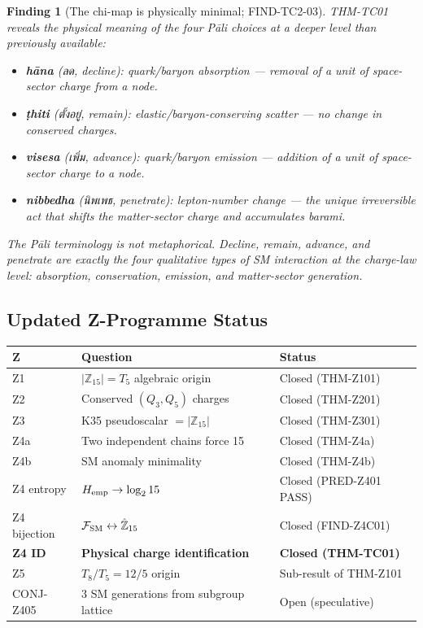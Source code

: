 \documentclass[12pt, a4paper]{article}
\newtheorem{finding}{Finding}[section]
\begin{document}
\begin{finding}[The chi-map is physically minimal; FIND-TC2-03]
THM-TC01 reveals the physical meaning of the four Pāli choices
at a deeper level than previously available:
\begin{itemize}[leftmargin=*, noitemsep]
  \item \textbf{hāna} (ลด, decline): quark/baryon absorption — removal
    of a unit of space-sector charge from a node.
  \item \textbf{ṭhiti} (ตั้งอยู่, remain): elastic/baryon-conserving
    scatter — no change in conserved charges.
  \item \textbf{visesa} (เพิ่ม, advance): quark/baryon emission —
    addition of a unit of space-sector charge to a node.
  \item \textbf{nibbedha} (นิพเพธ, penetrate): lepton-number change —
    the unique irreversible act that shifts the matter-sector
    charge and accumulates barami.
\end{itemize}
The Pāli terminology is not metaphorical. Decline, remain, advance,
and penetrate are exactly the four qualitative types of SM interaction
at the charge-law level: absorption, conservation, emission, and
matter-sector generation.
\end{finding}

\subsection{Updated Z-Programme Status}
\label{sec:status}

\begin{derivedbox}[title={Z-Programme: Final Status}]
{\small
\renewcommand{\arraystretch}{1.30}
\begin{tabular}{p{1.2cm} p{7.5cm} p{3.5cm}}
\toprule
\textbf{Z} & \textbf{Question} & \textbf{Status} \\
\midrule
Z1 & $|\mathbb{Z}_{15}| = T_5$ algebraic origin & Closed (THM-Z101) \\
Z2 & Conserved $(Q_3, Q_5)$ charges & Closed (THM-Z201) \\
Z3 & K35 pseudoscalar $= |\mathbb{Z}_{15}|$ & Closed (THM-Z301) \\
Z4a & Two independent chains force 15 & Closed (THM-Z4a) \\
Z4b & SM anomaly minimality & Closed (THM-Z4b) \\
Z4 entropy & $H_{\rm emp} \to \log_2 15$ & Closed (PRED-Z401 PASS) \\
Z4 bijection & $\mathcal{F}_{\rm SM} \leftrightarrow \hat{\mathbb{Z}}_{15}$ & Closed (FIND-Z4C01) \\
\textbf{Z4 ID} & \textbf{Physical charge identification} &
  \textbf{Closed (THM-TC01)} \\
Z5 & $T_8/T_5 = 12/5$ origin & Sub-result of THM-Z101 \\
\midrule
CONJ-Z405 & 3 SM generations from subgroup lattice & Open (speculative) \\
\bottomrule
\end{tabular}
}
\end{derivedbox}
\end{document}
